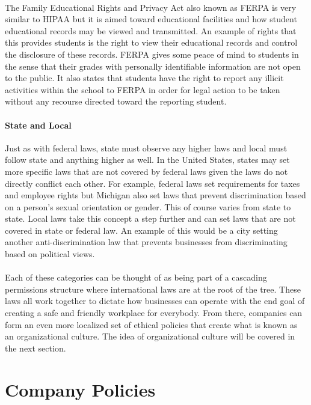 \documentclass[notitlepage,a4paper,12pt]{article}
\begin{document}
\paragraph{}The Family Educational Rights and Privacy Act also known as FERPA is very similar to HIPAA but it is aimed toward educational facilities and how student educational records may be viewed and transmitted. An example of rights that this provides students is the right to view their educational records and control the disclosure of these records. FERPA gives some peace of mind to students in the sense that their grades with personally identifiable information are not open to the public. It also states that students have the right to report any illicit activities within the school to FERPA in order for legal action to be taken without any recourse directed toward the reporting student.
\paragraph{State and Local}Just as with federal laws, state must observe any higher laws and local must follow state and anything higher as well. In the United States, states may set more specific laws that are not covered by federal laws given the laws do not directly conflict each other. For example, federal laws set requirements for taxes and employee rights but Michigan also set laws that prevent discrimination based on a person's sexual orientation or gender. This of course varies from state to state. Local laws take this concept a step further and can set laws that are not covered in state or federal law. An example of this would be a city setting another anti-discrimination law that prevents businesses from discriminating based on political views.
\paragraph{}Each of these categories can be thought of as being part of a cascading permissions structure where international laws are at the root of the tree. These laws all work together to dictate how businesses can operate with the end goal of creating a safe and friendly workplace for everybody. From there, companies can form an even more localized set of ethical policies that create what is known as an organizational culture. The idea of organizational culture will be covered in the next section.

\section*{Company Policies}
\end{document}
